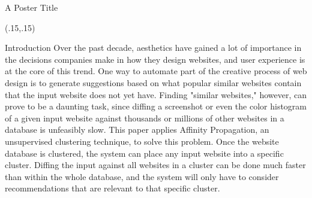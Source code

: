 \documentclass{beamer}
\begin{document}
\begin{block}{\centering \Huge {A Poster Title}}
\end{block}

\begin{textblock}{5}(.15,.15)
\begin{block}{Introduction}
Over the past decade, aesthetics have gained a lot of importance in the decisions companies
make in how they design websites, and user experience is at the core of this trend. One way to
automate part of the creative process of web design is to generate suggestions based on what
popular similar websites contain that the input website does not yet have. Finding "similar
websites," however, can prove to be a daunting task, since diffing a screenshot or even the
color histogram of a given input website against thousands or millions of other websites in a
database is unfeasibly slow. This paper applies Affinity Propagation, an unsupervised clustering
technique, to solve this problem. Once the website database is clustered, the system can place
any input website into a specific cluster. Diffing the input against all websites in a cluster can be
done much faster than within the whole database, and the system will only have to consider
recommendations that are relevant to that specific cluster. 
\end{block}


\end{textblock}
\end{document}
